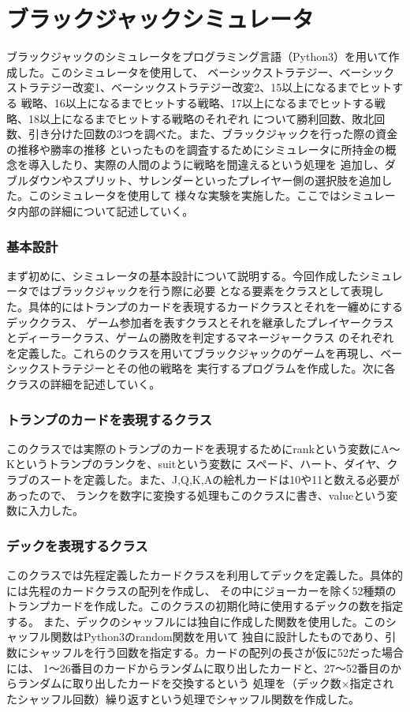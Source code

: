 \section{ブラックジャックシミュレータ}
ブラックジャックのシミュレータをプログラミング言語（Python3）を用いて作成した。このシミュレータを使用して、
ベーシックストラテジー、ベーシックストラテジー改変1、ベーシックストラテジー改変2、15以上になるまでヒットする
戦略、16以上になるまでヒットする戦略、17以上になるまでヒットする戦略、18以上になるまでヒットする戦略のそれぞれ
について勝利回数、敗北回数、引き分けた回数の3つを調べた。また、ブラックジャックを行った際の資金の推移や勝率の推移
といったものを調査するためにシミュレータに所持金の概念を導入したり、実際の人間のように戦略を間違えるという処理を
追加し、ダブルダウンやスプリット、サレンダーといったプレイヤー側の選択肢を追加した。このシミュレータを使用して
様々な実験を実施した。ここではシミュレータ内部の詳細について記述していく。

\subsubsection{基本設計}
まず初めに、シミュレータの基本設計について説明する。今回作成したシミュレータではブラックジャックを行う際に必要
となる要素をクラスとして表現した。具体的にはトランプのカードを表現するカードクラスとそれを一纏めにするデッククラス、
ゲーム参加者を表すクラスとそれを継承したプレイヤークラスとディーラークラス、ゲームの勝敗を判定するマネージャークラス
のそれぞれを定義した。これらのクラスを用いてブラックジャックのゲームを再現し、ベーシックストラテジーとその他の戦略を
実行するプログラムを作成した。次に各クラスの詳細を記述していく。

\subsubsection{トランプのカードを表現するクラス}
このクラスでは実際のトランプのカードを表現するためにrankという変数にA～Kというトランプのランクを、suitという変数に
スペード、ハート、ダイヤ、クラブのスートを定義した。また、J,Q,K,Aの絵札カードは10や11と数える必要があったので、
ランクを数字に変換する処理もこのクラスに書き、valueという変数に入力した。

\subsubsection{デックを表現するクラス}
このクラスでは先程定義したカードクラスを利用してデックを定義した。具体的には先程のカードクラスの配列を作成し、
その中にジョーカーを除く52種類のトランプカードを作成した。このクラスの初期化時に使用するデックの数を指定する。
また、デックのシャッフルには独自に作成した関数を使用した。このシャッフル関数はPython3のrandom関数を用いて
独自に設計したものであり、引数にシャッフルを行う回数を指定する。カードの配列の長さが仮に52だった場合には、
1～26番目のカードからランダムに取り出したカードと、27～52番目のからランダムに取り出したカードを交換するという
処理を（デック数×指定されたシャッフル回数）繰り返すという処理でシャッフル関数を作成した。

